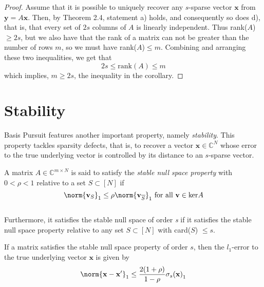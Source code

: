 \begin{proof}
Assume that it is possible to uniquely recover any $s$-sparse vector $\mathbf{x}$ from $\mathbf{y}=A\mathbf{x}$. Then, by Theorem 2.4, statement a) holds, and consequently so does d), that is, that every set of $2s$ columns of $A$ is linearly independent. Thus rank($A$) $\geq 2s$, but we also have that the rank of a matrix can not be greater than the number of rows $m$, so we must have rank($A$)$\leq m$. Combining and arranging these two inequalities, we get that 
\begin{equation*}
2s \leq \text{rank}(A) \leq m
\end{equation*}
which implies, $m \geq 2s$, the inequality in the corollary.
\end{proof}


\section*{Stability}


Basis Pursuit features another important property, namely \emph{stability}.
This property tackles sparsity defects, that is, to recover a vector $\mathbf{x} \in \mathbb{C}^N$ whose error to the true underlying vector is controlled by its distance to an $s$-sparse vector. 


\begin{tcolorbox}[colback=blue,colframe=white]
\begin{definition}
A matrix $A \in \mathbb{C}^{m \times N}$ is said to satisfy the \emph{stable null space property} with $0 < \rho < 1$ relative to a set $S \subset [N]$ if 
\begin{equation*}
\norm{ \mathbf{v}_{S}}_{1}  \leq  \rho \norm{ \mathbf{v}_{\overline{S}}}_{1} \ \text{for all} \ \mathbf{v} \in \text{ker} A
\end{equation*}
\\ Furthermore, it satisfies the stable null space of order \emph{s} if it satisfies the stable null space property relative to any set $S \subset [N]$ with card($S$) $\leq s$.

\end{definition}
\end{tcolorbox}

If a matrix satisfies the stable null space property of order $s$, then the $l_1$-error to the true underlying vector $\mathbf{x}$ is given by 
\begin{equation}
\norm{\mathbf{x-x'}}_1 \leq \frac{2(1+\rho)}{1-\rho}\sigma_s \mathbf{(x)}_1
\end{equation}

